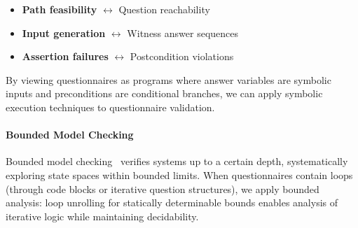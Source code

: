 \begin{itemize}
    \item \textbf{Path feasibility} $\leftrightarrow$ Question reachability
    \item \textbf{Input generation} $\leftrightarrow$ Witness answer sequences
    \item \textbf{Assertion failures} $\leftrightarrow$ Postcondition violations
\end{itemize}

By viewing questionnaires as programs where answer variables are symbolic inputs and preconditions are conditional branches, we can apply symbolic execution techniques to questionnaire validation.

\paragraph{Bounded Model Checking}

Bounded model checking~\cite{biere1999symbolic, clarke2001bounded} verifies systems up to a certain depth, systematically exploring state spaces within bounded limits. When questionnaires contain loops (through code blocks or iterative question structures), we apply bounded analysis: loop unrolling for statically determinable bounds enables analysis of iterative logic while maintaining decidability.
